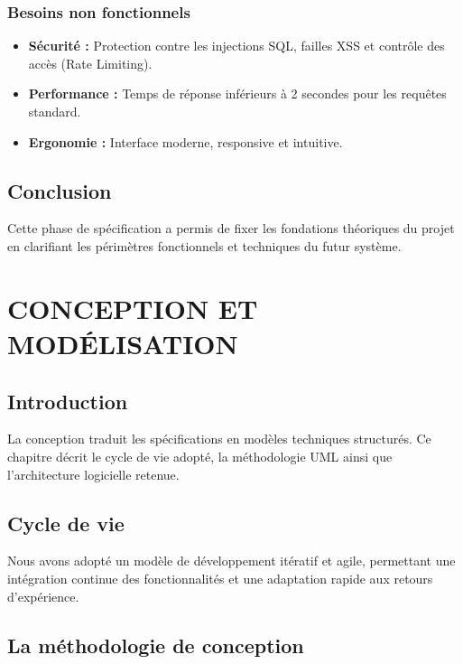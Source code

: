 \documentclass[12pt, a4paper, oneside]{report}
\begin{document}
\subsection{Besoins non fonctionnels}
\begin{itemize}
  \item \textbf{Sécurité :} Protection contre les injections SQL, failles XSS et contrôle des accès (Rate Limiting).
  \item \textbf{Performance :} Temps de réponse inférieurs à 2 secondes pour les requêtes standard.
  \item \textbf{Ergonomie :} Interface moderne, responsive et intuitive.
\end{itemize}

\section{Conclusion}
Cette phase de spécification a permis de fixer les fondations théoriques du projet en clarifiant les périmètres fonctionnels et techniques du futur système.

\chapter{CONCEPTION ET MODÉLISATION}

\section{Introduction}
La conception traduit les spécifications en modèles techniques structurés. Ce chapitre décrit le cycle de vie adopté, la méthodologie UML ainsi que l'architecture logicielle retenue.

\section{Cycle de vie}
Nous avons adopté un modèle de développement itératif et agile, permettant une intégration continue des fonctionnalités et une adaptation rapide aux retours d'expérience.

\section{La méthodologie de conception}
\end{document}
